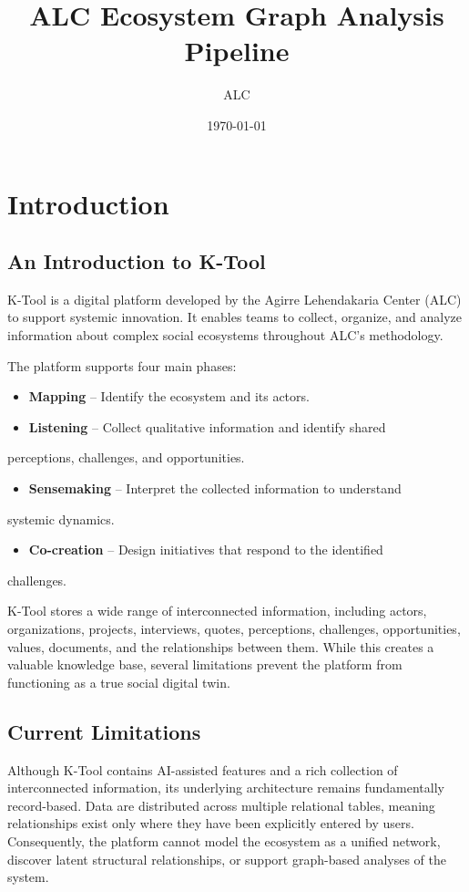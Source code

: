 \documentclass[11pt,a4paper]{article}
\title{ALC Ecosystem Graph Analysis Pipeline}
\author{ALC}
\date{\today}
\begin{document}
\maketitle
\tableofcontents
\newpage
\section{Introduction}

\subsection{An Introduction to K-Tool}

K-Tool is a digital platform developed by the Agirre Lehendakaria Center
(ALC) to support systemic innovation. It enables teams to collect,
organize, and analyze information about complex social ecosystems
throughout ALC's methodology.

The platform supports four main phases:

\begin{itemize}
    \item \textbf{Mapping} -- Identify the ecosystem and its actors.
    \item \textbf{Listening} -- Collect qualitative information and identify shared
\end{itemize}
  perceptions, challenges, and opportunities.
\begin{itemize}
    \item \textbf{Sensemaking} -- Interpret the collected information to understand
\end{itemize}
  systemic dynamics.
\begin{itemize}
    \item \textbf{Co-creation} -- Design initiatives that respond to the identified
\end{itemize}
  challenges.

K-Tool stores a wide range of interconnected information, including
actors, organizations, projects, interviews, quotes, perceptions,
challenges, opportunities, values, documents, and the relationships
between them. While this creates a valuable knowledge base, several
limitations prevent the platform from functioning as a true social
digital twin.

\subsection{Current Limitations}

Although K-Tool contains AI-assisted features and a rich collection of
interconnected information, its underlying architecture remains
fundamentally record-based. Data are distributed across multiple
relational tables, meaning relationships exist only where they have been
explicitly entered by users. Consequently, the platform cannot model the
ecosystem as a unified network, discover latent structural
relationships, or support graph-based analyses of the system.
\end{document}
